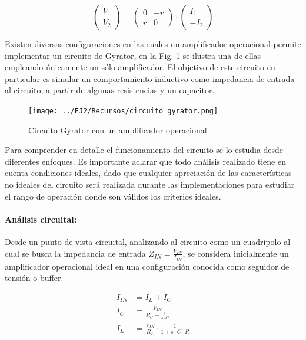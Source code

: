 \begin{equation*}
    \begin{pmatrix}
        V_1 \\ V_2
    \end{pmatrix}
    =
    \begin{pmatrix}
        0 & -r \\
        r & 0
    \end{pmatrix}
    \cdot 
    \begin{pmatrix}
        I_1 \\ -I_2
    \end{pmatrix}
    \label{eq:parametros_gyrator}
\end{equation*}

Existen diversas configuraciones en las cuales un amplificador operacional permite implementar un circuito de Gyrator, en la Fig. \ref{fig:circuito_gyrator} se ilustra una de ellas
empleando \'unicamente un s\'olo amplificador. El objetivo de este circuito en particular es simular un comportamiento inductivo como impedancia de entrada al circuito, a partir de algunas resistencias y un capacitor.

\begin{figure}[H]
    \centering
    \texttt{[image: ../EJ2/Recursos/circuito\_gyrator.png]}
    \caption{Circuito Gyrator con un amplificador operacional}
    \label{fig:circuito_gyrator}
\end{figure}

Para comprender en detalle el funcionamiento del circuito se lo estudia desde diferentes enfoques. Es importante aclarar que todo an\'alisis realizado tiene en cuenta condiciones ideales,
dado que cualquier apreciaci\'on de las caracter\'isticas no ideales del circuito ser\'a realizada durante las implementaciones para estudiar el rango de operaci\'on donde son v\'alidos los criterios ideales.

\paragraph*{An\'alisis circuital: } Desde un punto de vista circuital, analizando al circuito como un cuadripolo al cual se busca la impedancia de entrada $Z_{IN} = \frac{V_{IN}}{I_{IN}}$, se considera inicialmente un amplificador operacional ideal en una configuraci\'on conocida como seguidor de tensi\'on o buffer.

\begin{eqnarray*}
    I_{IN} & = I_L + I_C \\
    I_C & = \frac{V_{IN}}{R_C + \frac{1}{s \cdot C}} \\
    I_L & = \frac{V_{IN}}{R_L} \cdot \frac{1}{1 + s \cdot C \cdot R}
\end{eqnarray*}

